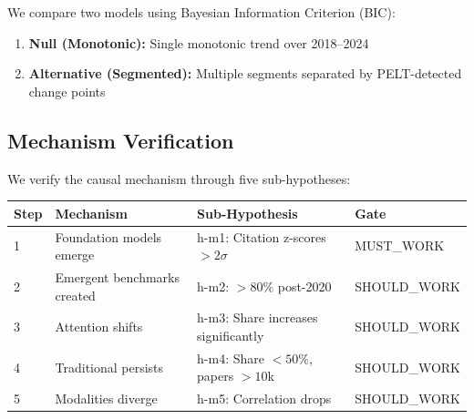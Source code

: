 We compare two models using Bayesian Information Criterion (BIC):
\begin{enumerate}
    \item \textbf{Null (Monotonic):} Single monotonic trend over 2018--2024
    \item \textbf{Alternative (Segmented):} Multiple segments separated by PELT-detected change points
\end{enumerate}

\subsection{Mechanism Verification}

We verify the causal mechanism through five sub-hypotheses:

\begin{table}[h]
\centering
\begin{tabular}{@{}llll@{}}
\toprule
Step & Mechanism & Sub-Hypothesis & Gate \\
\midrule
1 & Foundation models emerge & h-m1: Citation z-scores $>2\sigma$ & MUST\_WORK \\
2 & Emergent benchmarks created & h-m2: $>80\%$ post-2020 & SHOULD\_WORK \\
3 & Attention shifts & h-m3: Share increases significantly & SHOULD\_WORK \\
4 & Traditional persists & h-m4: Share $<50\%$, papers $>10$k & SHOULD\_WORK \\
5 & Modalities diverge & h-m5: Correlation drops & SHOULD\_WORK \\
\bottomrule
\end{tabular}
\end{table}
